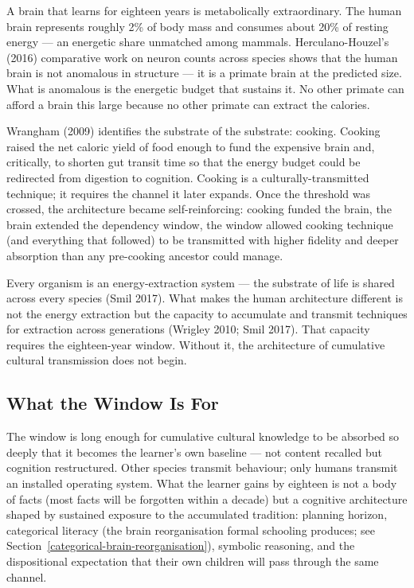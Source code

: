 \documentclass[12pt,letterpaper]{article}
\begin{document}
A brain that learns for eighteen years is metabolically extraordinary.
The human brain represents roughly 2\% of body mass and consumes
about 20\% of resting energy --- an energetic share unmatched among
mammals. Herculano-Houzel's (2016) comparative work on neuron counts
across species shows that the human brain is not anomalous in
structure --- it is a primate brain at the predicted size. What is
anomalous is the energetic budget that sustains it. No other primate
can afford a brain this large because no other primate can extract
the calories.

Wrangham (2009) identifies the substrate of the substrate: cooking.
Cooking raised the net caloric yield of food enough to fund the
expensive brain and, critically, to shorten gut transit time so that
the energy budget could be redirected from digestion to cognition.
Cooking is a culturally-transmitted technique; it requires the
channel it later expands. Once the threshold was crossed, the
architecture became self-reinforcing: cooking funded the brain, the
brain extended the dependency window, the window allowed cooking
technique (and everything that followed) to be transmitted with
higher fidelity and deeper absorption than any pre-cooking ancestor
could manage.

Every organism is an energy-extraction system --- the substrate of
life is shared across every species (Smil 2017). What makes the
human architecture different is not the energy extraction but the
capacity to accumulate and transmit techniques for extraction across
generations (Wrigley 2010; Smil 2017). That capacity requires the
eighteen-year window. Without it, the architecture of cumulative
cultural transmission does not begin.

\subsection{What the Window Is For}\label{what-the-window-is-for}

The window is long enough for cumulative cultural knowledge to be
absorbed so deeply that it becomes the learner's own baseline ---
not content recalled but cognition restructured. Other species
transmit behaviour; only humans transmit an installed operating
system. What the learner gains by eighteen is not a body of facts
(most facts will be forgotten within a decade) but a cognitive
architecture shaped by sustained exposure to the accumulated
tradition: planning horizon, categorical literacy (the brain
reorganisation formal schooling produces; see
Section~\ref{categorical-brain-reorganisation}), symbolic reasoning,
and the dispositional expectation that their own children will pass
through the same channel.
\end{document}
